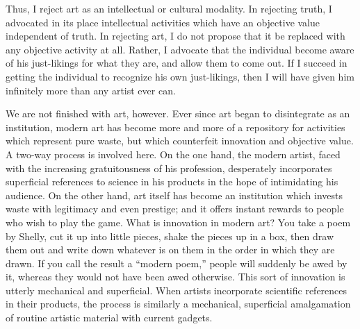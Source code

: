 Thus, I reject art as an intellectual or cultural modality. In rejecting 
truth, I advocated in its place intellectual activities which have an objective 
value independent of truth. In rejecting art, I do not propose that it be 
replaced with any objective activity at all. Rather, I advocate that the 
individual become aware of his just-likings for what they are, and allow them 
to come out. If I succeed in getting the individual to recognize his own 
just-likings, then I will have given him infinitely more than any artist ever 
can. 

We are not finished with art, however. Ever since art began to 
disintegrate as an institution, modern art has become more and more of a 
repository for activities which represent pure waste, but which counterfeit 
innovation and objective value. A two-way process is involved here. On the 
one hand, the modern artist, faced with the increasing gratuitousness of his 
profession, desperately incorporates superficial references to science in his 
products in the hope of intimidating his audience. On the other hand, art 
itself has become an institution which invests waste with legitimacy and even 
prestige; and it offers instant rewards to people who wish to play the game. 
What is innovation in modern art? You take a poem by Shelly, cut it up into 
little pieces, shake the pieces up in a box, then draw them out and write 
down whatever is on them in the order in which they are drawn. If you call 
the result a \enquote{modern poem,} people will suddenly be awed by it, whereas 
they would not have been awed otherwise. This sort of innovation is utterly 
mechanical and superficial. When artists incorporate scientific references in 
their products, the process is similarly a mechanical, superficial 
amalgamation of routine artistic material with current gadgets. 

